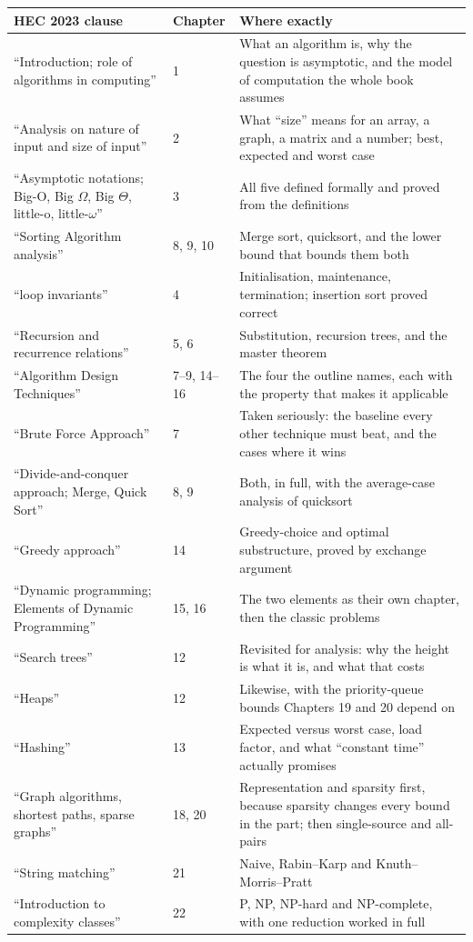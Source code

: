 \begin{longtable}{@{}L{6.4cm}L{2.0cm}L{6.6cm}@{}}
\toprule
{}
\textbf{HEC 2023 clause} & \textbf{Chapter} & \textbf{Where exactly} \\
\midrule
\endhead
``Introduction; role of algorithms in computing'' & 1 & What an algorithm is,
why the question is asymptotic, and the model of computation the whole book
assumes \\
``Analysis on nature of input and size of input'' & 2 & What ``size'' means for
an array, a graph, a matrix and a number; best, expected and worst case \\
``Asymptotic notations; Big-O, Big $\Omega$, Big $\Theta$, little-o,
little-$\omega$'' & 3 & All five defined formally and proved from the
definitions \\
``Sorting Algorithm analysis'' & 8, 9, 10 & Merge sort, quicksort, and the
lower bound that bounds them both \\
``loop invariants'' & 4 & Initialisation, maintenance, termination; insertion
sort proved correct \\
``Recursion and recurrence relations'' & 5, 6 & Substitution, recursion trees,
and the master theorem \\
``Algorithm Design Techniques'' & 7--9, 14--16 & The four the outline names,
each with the property that makes it applicable \\
``Brute Force Approach'' & 7 & Taken seriously: the baseline every other
technique must beat, and the cases where it wins \\
``Divide-and-conquer approach; Merge, Quick Sort'' & 8, 9 & Both, in full, with
the average-case analysis of quicksort \\
``Greedy approach'' & 14 & Greedy-choice and optimal substructure, proved by
exchange argument \\
``Dynamic programming; Elements of Dynamic Programming'' & 15, 16 & The two
elements as their own chapter, then the classic problems \\
``Search trees'' & 12 & Revisited for analysis: why the height is what it is,
and what that costs \\
``Heaps'' & 12 & Likewise, with the priority-queue bounds Chapters 19 and 20
depend on \\
``Hashing'' & 13 & Expected versus worst case, load factor, and what
``constant time'' actually promises \\
``Graph algorithms, shortest paths, sparse graphs'' & 18, 20 & Representation
and sparsity first, because sparsity changes every bound in the part; then
single-source and all-pairs \\
``String matching'' & 21 & Naive, Rabin--Karp and Knuth--Morris--Pratt \\
``Introduction to complexity classes'' & 22 & P, NP, NP-hard and NP-complete,
with one reduction worked in full \\
\bottomrule
\end{longtable}

